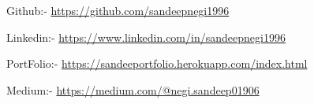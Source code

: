 
\begin{importantlinks}

  \importantlinks
    {Github:- } %
    {\url{https://github.com/sandeepnegi1996}}
  

  \importantlinks
    {Linkedin:- } %
    {\url{https://www.linkedin.com/in/sandeepnegi1996}} %

  \importantlinks
    {PortFolio:- } %
    {\url{https://sandeeportfolio.herokuapp.com/index.html}} %
    
   \importantlinks
    {Medium:- } %
    {\url{https://medium.com/@negi.sandeep01906}} %

\end{importantlinks}